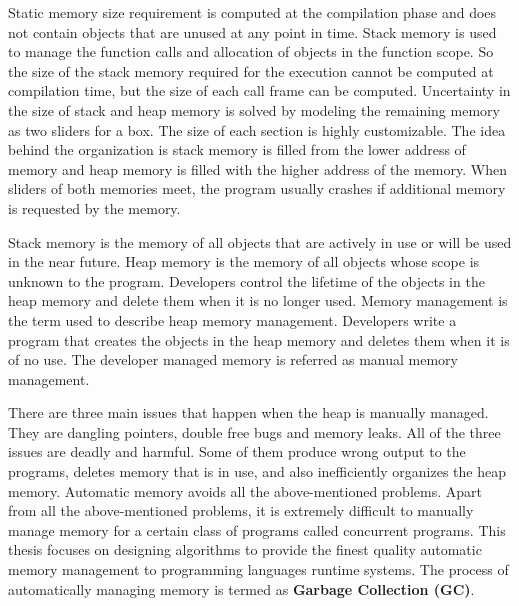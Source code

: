 Static memory size requirement is computed at the compilation phase and does not contain objects that are unused at any point in time. Stack memory is used to manage the function calls and allocation of objects in the function scope. So the size of the stack memory required for the execution cannot be computed at compilation time, but the size of each call frame can be computed. Uncertainty in the size of stack and heap memory is solved by modeling the remaining memory as two sliders for a box. The size of each section is highly customizable. The idea behind the organization is stack memory is filled from the lower address of memory and heap memory is filled with the higher address of the memory. When sliders of both memories meet, the program usually crashes if additional memory is requested by the memory. 

Stack memory is the memory of all objects that are actively in use or will be used in the near future. Heap memory is the memory of all objects whose scope is unknown to the program. Developers control the lifetime of the objects in the heap memory and delete them when it is no longer used. Memory management is the term used to describe heap memory management. Developers write a program that creates the objects in the heap memory and deletes them when it is of no use. The developer managed memory is referred as manual memory management. 

There are three main issues that happen when the heap is manually managed. They are dangling pointers, double free bugs and memory leaks. All of the three issues are deadly and harmful. Some of them produce wrong output to the programs, deletes memory that is in use, and also inefficiently organizes the heap memory. Automatic memory avoids all the above-mentioned problems. Apart from all the above-mentioned problems, it is extremely difficult to manually manage memory for a certain class of programs called concurrent programs. This thesis focuses on designing algorithms to provide the finest quality automatic memory management to programming languages runtime systems. The process of automatically managing memory is termed as \textbf{Garbage Collection (GC)}.
\begin{comment}
Heap memory helps a developer to extend the life of dynamically allocated objects. Some object allocated in the heap might get a very long life as long as the life of the program running. So these objects have an infinite life if the programmer did not delete them after their last use. The unwanted objects in the heap occupy the heap memory and might make an application run out of memory and exit. In order to avoid pseudo full heap memory errors, programmers determine the life of the dynamically allocated objects and delete them. The dynamically allocated objects can be accessed only by pointers in the static and stack memory. These pointers are also called as \textbf{roots}.
\end{comment}
